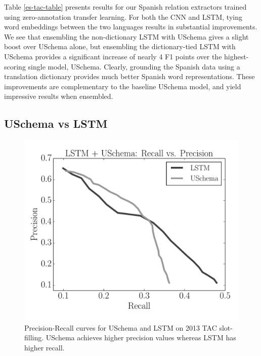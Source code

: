 Table \ref{es-tac-table} presents results for our Spanish relation extractors trained using zero-annotation transfer learning. For both the CNN and LSTM, tying word embeddings between the two languages results in substantial improvements. We see that ensembling the non-dictionary LSTM with USchema gives a slight boost over USchema alone, but ensembling the dictionary-tied LSTM with USchema provides a significant increase of nearly 4 F1 points over the highest-scoring single model, USchema. Clearly, grounding the Spanish data using a translation dictionary provides much better Spanish word representations. These improvements are complementary to the baseline USchema model, and yield impressive results when ensembled.




\subsection{USchema vs LSTM \label{sec:uschema-lstm}}

\begin{figure}
\begin{center}
\includegraphics[scale=0.45]{pr-curve}
\caption{Precision-Recall curves for USchema and LSTM on 2013 TAC slot-filling. USchema achieves higher precision values whereas LSTM has higher recall. \label{fig:pr-curve}}
\end{center}
\end{figure}

